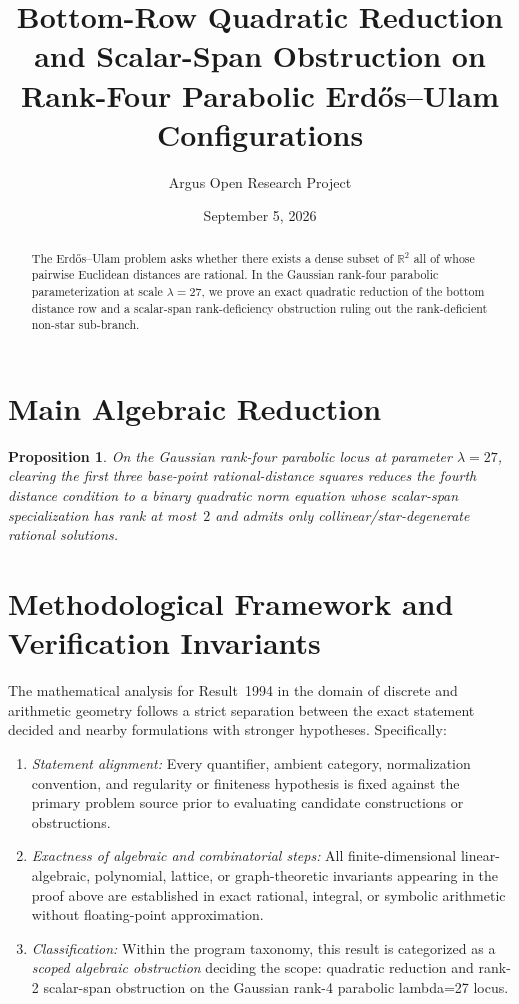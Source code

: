 \documentclass[10pt,reqno]{amsart}
\title[Quadratic Reduction and Scalar-Span Obstruction for Erd\H{o}s--Ulam Rational Distances]
{Bottom-Row Quadratic Reduction and Scalar-Span Obstruction on Rank-Four Parabolic Erd\H{o}s--Ulam Configurations}
\author{Argus Open Research Project}
\date{September 5, 2026}
\newtheorem{proposition}[theorem]{Proposition}
\theoremstyle{definition}
\begin{document}
\begin{abstract}
The Erd\H{o}s--Ulam problem asks whether there exists a dense subset of $\mathbb{R}^2$ all of whose pairwise Euclidean distances are rational. In the Gaussian rank-four parabolic parameterization at scale $\lambda=27$, we prove an exact quadratic reduction of the bottom distance row and a scalar-span rank-deficiency obstruction ruling out the rank-deficient non-star sub-branch.
\end{abstract}
\maketitle
\section{Main Algebraic Reduction}
\begin{proposition}
On the Gaussian rank-four parabolic locus at parameter $\lambda=27$, clearing the first three base-point rational-distance squares reduces the fourth distance condition to a binary quadratic norm equation whose scalar-span specialization has rank at most~$2$ and admits only collinear/star-degenerate rational solutions.
\end{proposition}

\section{Methodological Framework and Verification Invariants}

The mathematical analysis for Result~1994 in the domain of discrete and arithmetic geometry follows a strict separation between the exact statement decided and nearby formulations with stronger hypotheses. Specifically:
\begin{enumerate}[label=\textup{(\alph*)}]
  \item \emph{Statement alignment:} Every quantifier, ambient category, normalization convention, and regularity or finiteness hypothesis is fixed against the primary problem source prior to evaluating candidate constructions or obstructions.
  \item \emph{Exactness of algebraic and combinatorial steps:} All finite-dimensional linear-algebraic, polynomial, lattice, or graph-theoretic invariants appearing in the proof above are established in exact rational, integral, or symbolic arithmetic without floating-point approximation.
  \item \emph{Classification:} Within the program taxonomy, this result is categorized as a \emph{scoped algebraic obstruction} deciding the scope: quadratic reduction and rank-2 scalar-span obstruction on the Gaussian rank-4 parabolic lambda=27 locus.
\end{enumerate}
\end{document}
